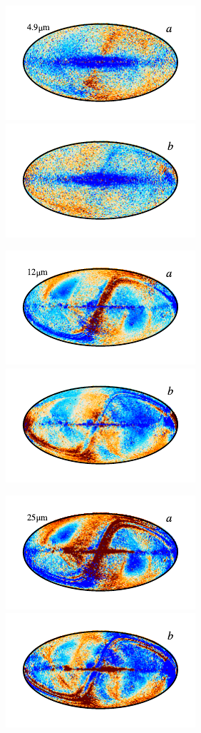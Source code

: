 \documentclass{aa}
\begin{document}
\begin{figure}
	\includegraphics{figs/res_maps/res_04a_c0001_000019.pdf}\includegraphics{figs/res_maps/res_04b_c0001_000019.pdf}
  \vspace*{-0.85cm}

	\includegraphics{figs/res_maps/res_05a_c0001_000019.pdf}\includegraphics{figs/res_maps/res_05b_c0001_000019.pdf}
  \vspace*{-0.85cm}

	\includegraphics{figs/res_maps/res_06a_c0001_000019.pdf}\includegraphics{figs/res_maps/res_06b_c0001_000019.pdf}
  \vspace*{-0.85cm}


\end{figure}
\end{document}
